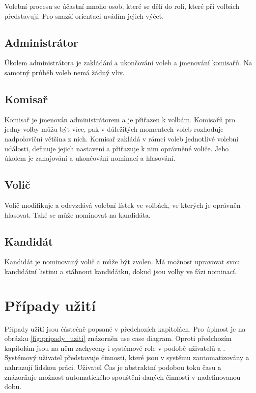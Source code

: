 \documentclass[11pt,twoside,a4paper]{book}
\begin{document}
Volební procesu se účastní mnoho osob, které se dělí do rolí, které při volbách představují. Pro snazší orientaci uvádím jejich výčet.

\subsection{Administrátor}

Úkolem administrátora je zakládání a ukončování voleb a jmenování komisařů. Na samotný průběh voleb nemá žádný vliv. 

\subsection{Komisař}

Komisař je jmenován administrátorem a je přiřazen k volbám. Komisařů pro jedny volby můžu být více, pak v důležitých momentech voleb rozhoduje nadpoloviční většina z nich. Komisař zakládá v rámci voleb jednotlivé volební události, definuje jejich nastavení a přiřazuje k nim oprávněné voliče. Jeho úkolem je zahajování a ukončování nominací a hlasování.

\subsection{Volič}

Volič modifikuje a odevzdává volební lístek ve volbách, ve kterých je oprávněn hlasovat. Také se může nominovat na kandidáta.


\subsection{Kandidát}

Kandidát je nominovaný volič a může být zvolen. Má možnost upravovat svou kandidátní listinu a stáhnout kandidátku, dokud jsou volby ve fázi nominací.

\section{Případy užití}

Případy užití jsou částečně popsané v předchozích kapitolách. Pro úplnost je na obrázku \ref{fig:pripady_uziti} znázorněn use case diagram. Oproti předchozím kapitolám jsou na něm zachyceny i systémové role v podobě uživatelů  a . Systémový uživatel představuje činnosti, které jsou v systému zautomatizovány a nahrazují lidskou práci. Uživatel Čas je abstraktní podobou toku času a znázorňuje možnost automatického spouštění daných činností v nadefinovanou dobu. 
\end{document}
